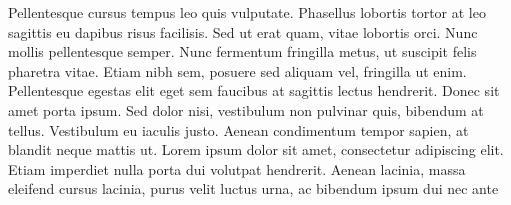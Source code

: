 \documentclass[a4paper,10pt]{article}
\begin{document}
Pellentesque cursus tempus leo quis vulputate. Phasellus lobortis tortor at leo sagittis eu dapibus risus facilisis. Sed ut erat quam, vitae lobortis orci. Nunc mollis pellentesque semper. Nunc fermentum fringilla metus, ut suscipit felis pharetra vitae. Etiam nibh sem, posuere sed aliquam vel, fringilla ut enim. Pellentesque egestas elit eget sem faucibus at sagittis lectus hendrerit. Donec sit amet porta ipsum. Sed dolor nisi, vestibulum non pulvinar quis, bibendum at tellus. Vestibulum eu iaculis justo. Aenean condimentum tempor sapien, at blandit neque mattis ut. Lorem ipsum dolor sit amet, consectetur adipiscing elit. Etiam imperdiet nulla porta dui volutpat hendrerit. Aenean lacinia, massa eleifend cursus lacinia, purus velit luctus urna, ac bibendum ipsum dui nec ante
\end{document}
